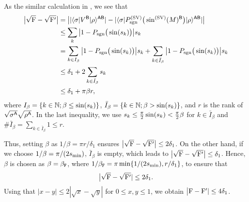 As the similar calculation in , we see that
\begin{align}
\label{inteq:120}
    \big|\sqrt{{\mathrm{F}}} - \sqrt{{\mathrm{F}}'}\big|
    &= \big| |\langle\sigma|V^{\mathsf{B}}|\rho\rangle^{{\mathsf{A}}{\mathsf{B}}}| - |\langle\sigma|P_{\mathrm{sgn}}^{(\rm SV)}\big(\sin^{(\rm SV)}(M)^{\mathsf{B}}\big)|\rho\rangle^{{\mathsf{A}}{\mathsf{B}}}| \big| \\
    &\leq \sum_k \big|1 - P_{\mathrm{sgn}}\big(\sin(s_k)\big)\big|s_k \notag\\
    \label{inteq:40}
    &= \sum_{k\in I_\beta} \big|1 - P_{\mathrm{sgn}}\big(\sin(s_k)\big)\big|s_k  + \sum_{k\in \bar{I}_\beta} \big|1 - P_{\mathrm{sgn}}\big(\sin(s_k)\big)\big|s_k \\
    &\leq \delta_1 + 2 \sum_{k\in \bar{I}_\beta} s_k \\
    &\leq \delta_1 +  \pi\beta r,
\end{align}
where $I_\beta = \{k \in \mathbb{N}; \beta \leq \sin(s_k)\}$, $\bar{I}_\beta = \{k \in \mathbb{N}; \beta > \sin(s_k)\}$, and $r$ is the rank of $\sqrt{\sigma^{\mathsf{A}}}\sqrt{\rho^{\mathsf{A}}}$.
In the last inequality, we use $s_k \leq \frac{\pi}{2}\sin(s_k) < \frac{\pi}{2}\beta$ for $k \in \bar{I}_\beta$ and $\#\bar{I}_\beta = \sum_{k \in \bar{I}_\beta} 1 \leq r$.



Thus, setting $\beta$ as $1/\beta = \pi r/\delta_1$ ensures $\big|\sqrt{{\mathrm{F}}} - \sqrt{{\mathrm{F}}'}\big| \leq 2\delta_1$. 
On the other hand, if we choose $1/\beta = \pi/(2s_{\rm min})$, $\bar{I}_\beta$ is empty, which leads to $\big|\sqrt{{\mathrm{F}}} - \sqrt{{\mathrm{F}}'}\big|\leq \delta_1$.
Hence, $\beta$ is chosen as $\beta = \beta_{\mathtt{F}}$, where $1/\beta_{\mathtt{F}} = \pi\min\{1/(2s_{\rm min}), r/\delta_1\}$, 
to ensure that 
\begin{align}
\label{inteq:51}
    \big|\sqrt{{\mathrm{F}}} - \sqrt{{\mathrm{F}}'}| \leq 2\delta_1.
\end{align}
Using that $|x-y|\leq 2|\sqrt{x}-\sqrt{y}|$ for $0\leq x, y \leq 1$, we obtain $\big|{\mathrm{F}} - {\mathrm{F}}'| \leq 4\delta_1$.

